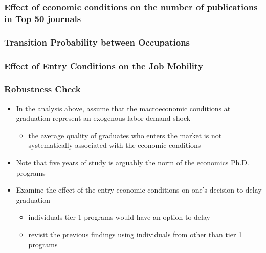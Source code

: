 \documentclass[11pt]{beamer}
\begin{document}
{
	\begin{frame}
		\frametitle{Effect of economic conditions  on the number of publications in Top 50  journals}
		
	\end{frame}
}


{
	\begin{frame}[label = mobility]
		\frametitle{Transition Probability between Occupations}
		
	\end{frame}
}



{
	\begin{frame}[label = mobility]
		\frametitle{Effect of Entry Conditions on the Job Mobility}
		
	\end{frame}
}





\begin{frame}[label = robustness]
	\frametitle{Robustness Check}
	\begin{itemize}
	\item In the analysis above,  assume that the macroeconomic conditions at graduation represent an exogenous labor demand shock
	\begin{itemize}
		\item  the average quality of graduates who enters the market is not systematically associated with the economic conditions
		\end{itemize}
	\vspace{1 mm}
	\item Note that five years of study is arguably the norm of the economics Ph.D. programs	
	\vspace{1 mm}
	\item Examine the effect of the entry economic conditions on one's decision to delay graduation %
	\begin{itemize}
		\item individuals tier 1 programs would have an option to delay 
		\item revisit the previous findings using individuals from other than tier 1 programs %
	\end{itemize}
\end{itemize}
\end{frame}
\end{document}

